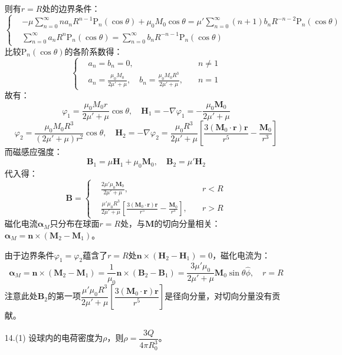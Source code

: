 \documentclass[a4paper,fontset=none]{ctexart}
\begin{document}
\begin{itemize}
    则有$r=R$处的边界条件：
    \[
    \left\{
        \begin{aligned}
        &-\mu\sum\limits_{n=0}^\infty n a_n R^{n-1}\mathrm{P}_n(\cos\theta)+\mu_0M_0\cos\theta = \mu'\sum\limits_{n=0}^\infty (n+1)b_n R^{-n-2}\mathrm{P}_n(\cos\theta) \\
        &\sum_{n=0}^\infty a_n R^n\mathrm{P}_n(\cos\theta) = \sum_{n=0}^\infty b_n R^{-n-1}\mathrm{P}_n(\cos\theta)
        \end{aligned}
    \right.
    \]
    比较$\mathrm{P}_n(\cos\theta)$的各阶系数得：
    \[
    \left\{
        \begin{aligned}
        &a_n = b_n = 0,\quad &n\neq1 \\
        &a_n = \frac{\mu_0 M_0}{2\mu'+\mu},\quad b_n = \frac{\mu_0 M_0 R^3}{2\mu'+\mu},\quad &n=1
        \end{aligned}
    \right.
    \]
    故有：
    \[
    \varphi_1 = \frac{\mu_0 M_0 r}{2\mu'+\mu}\cos\theta,\quad
    \bm{H}_1 = -\nabla\varphi_1 = -\frac{\mu_0\bm{M}_0}{2\mu'+\mu}
    \]
    \[
    \varphi_2 = \frac{\mu_0 M_0 R^3}{(2\mu'+\mu)r^2}\cos\theta,\quad
    \bm{H}_2 = -\nabla\varphi_2 = \frac{\mu_0 R^3}{2\mu'+\mu}\left[\frac{3(\bm{M}_0\cdot\bm{r})\bm{r}}{r^5}-\frac{\bm{M}_0}{r^3}\right]
    \]
    而磁感应强度：
    \[
        \bm{B}_1 = \mu\bm{H}_1 + \mu_0\bm{M}_0,\quad
        \bm{B}_2 = \mu'\bm{H}_2
    \]
    代入得：
    \[
    \bm{B} =
    \left\{
        \begin{aligned}
            &\frac{2\mu'\mu_0 \bm{M}_0}{2\mu'+\mu},\quad &r<R \\
            &\frac{\mu'\mu_0 R^3}{2\mu'+\mu}\left[\frac{3(\bm{M}_0\cdot\bm{r})\bm{r}}{r^5}-\frac{\bm{M}_0}{r^3}\right],\quad &r>R
        \end{aligned}
    \right.
    \]
    磁化电流$\bm{\alpha}_M$只分布在球面$r=R$处，与$\bm{M}$的切向分量相关：$\bm{\alpha}_M=\bm{n}\times(\bm{M}_2-\bm{M}_1)$。

    由于边界条件$\varphi_1=\varphi_2$蕴含了$r=R$处$\bm{n}\times(\bm{H}_2-\bm{H}_1)=0$，磁化电流为：
    \[
    \bm{\alpha}_M = \bm{n}\times(\bm{M}_2-\bm{M}_1) = \frac{1}{\mu_0}\bm{n}\times(\bm{B}_2-\bm{B}_1) = \frac{3\mu'\mu_0}{2\mu'+\mu}\bm{M}_0\sin\theta\hat{\phi},\quad r=R
    \]
    注意此处$\bm{B}_2$的第一项$\dfrac{\mu'\mu_0 R^3}{2\mu'+\mu}\left[\dfrac{3(\bm{M}_0\cdot\bm{r})\bm{r}}{r^5}\right]$是径向分量，对切向分量没有贡献。

    \item[14.(1)]
    设球内的电荷密度为$\rho$，则$\rho=\dfrac{3Q}{4\pi R_0^3}$。


\end{itemize}
\end{document}
